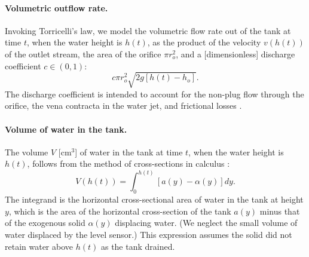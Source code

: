 \documentclass[a4paper,fleqn]{cas-dc}
\begin{document}
\paragraph{Volumetric outflow rate.}
Invoking Torricelli's law, we model the volumetric flow rate out of the tank at time $t$, when the water height is $h(t)$, as the product of the velocity $v(h(t))$ of the outlet stream, the area of the orifice $\pi r_o^2$, and a [dimensionless] discharge coefficient $c\in(0, 1)$:
\begin{equation}
	c \pi r_o^2 \sqrt{2 g [ h(t)-h_o] }. \label{eq:outletflow}
\end{equation}
The discharge coefficient is intended to account for the non-plug flow through the orifice, the vena contracta in the water jet, and frictional losses
\cite{horsch2020simple,teoman2022discharge,hicks2014determining,blasone2015discharge,lienhard1984velocity,wadhwa2021study}. 

\paragraph{Volume of water in the tank.}
The volume $V$ [cm$^3$] of water in the tank at time $t$, when the water height is $h(t)$, follows from the method of cross-sections in calculus \cite{debook}:
\begin{equation}
	V(h(t))=\int_0^{h(t)} \left[a(y) - \alpha(y) \right] dy. \label{eq:volume}
\end{equation}
The integrand is the horizontal cross-sectional area of water in the tank at height $y$, which is the area of the horizontal cross-section of the tank $a(y)$ minus that of the exogenous solid $\alpha(y)$ displacing water. (We neglect the small volume of water displaced by the level sensor.) 
This expression assumes the solid did not retain water above $h(t)$ as the tank drained. 


\end{document}

